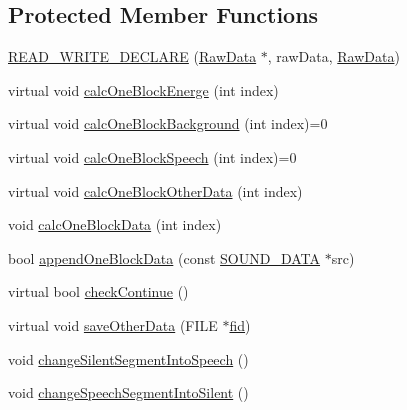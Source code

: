 \subsection*{Protected Member Functions}
\begin{DoxyCompactItemize}
\item 
\hyperlink{class_e_p_analysis_ad1d552418bdac23493701f726303c088}{R\+E\+A\+D\+\_\+\+W\+R\+I\+T\+E\+\_\+\+D\+E\+C\+L\+A\+R\+E} (\hyperlink{class_raw_data}{Raw\+Data} $\ast$, raw\+Data, \hyperlink{class_raw_data}{Raw\+Data})
\item 
virtual void \hyperlink{class_e_p_analysis_acd38ed7c170e41ce73a2af3f1e8b442f}{calc\+One\+Block\+Energe} (int index)
\item 
virtual void \hyperlink{class_e_p_analysis_ac0d297dde8d0e9663f2e2e3b5fa0bc39}{calc\+One\+Block\+Background} (int index)=0
\item 
virtual void \hyperlink{class_e_p_analysis_a7767c0329b482231ec33faf935a620ce}{calc\+One\+Block\+Speech} (int index)=0
\item 
virtual void \hyperlink{class_e_p_analysis_aba99bc553c0e1f82ca844a5130263e6f}{calc\+One\+Block\+Other\+Data} (int index)
\item 
void \hyperlink{class_e_p_analysis_a8390360185d73e872b00c1207ea3cd55}{calc\+One\+Block\+Data} (int index)
\item 
bool \hyperlink{class_e_p_analysis_a4bfa7381a0d922990521779f6c4b3ce5}{append\+One\+Block\+Data} (const \hyperlink{configure__basic_8h_abf32ffaff24ba21700fbd0898b49ab02}{S\+O\+U\+N\+D\+\_\+\+D\+A\+T\+A} $\ast$src)
\item 
virtual bool \hyperlink{class_e_p_analysis_aa9964f5d1dd52e46156ff2304104d26d}{check\+Continue} ()
\item 
virtual void \hyperlink{class_e_p_analysis_a0c4270a435264c7aa18408d7f350ca31}{save\+Other\+Data} (F\+I\+L\+E $\ast$\hyperlink{readhtk_8m_ae135fff58330ebb77574e0dd6280aa68}{fid})
\item 
void \hyperlink{class_e_p_analysis_a195f5fff329e1df4862758baa80a9454}{change\+Silent\+Segment\+Into\+Speech} ()
\item 
void \hyperlink{class_e_p_analysis_aeca6d7b752d925d884bee17237007bb4}{change\+Speech\+Segment\+Into\+Silent} ()
\end{DoxyCompactItemize}
